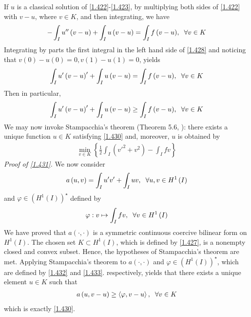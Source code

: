 \documentclass[a4paper,oneside]{article}
\numberwithin{equation}{section}
\begin{document}
If $u$ is a classical solution of \eqref{1.422}-\eqref{1.423}, by multiplying both sides of \eqref{1.422} with $v-u$, where $v\in K$, and then integrating,  we have
\begin{align}
\label{1.428}
 - \int_I {u''\left( {v - u} \right)}  + \int_I {u\left( {v - u} \right)}  = \int_I {f\left( {v - u} \right)} ,\hspace{0.2cm}\forall v \in K
\end{align}
Integrating by parts the first integral in the left hand side of \eqref{1.428} and noticing that $v\left(0\right)-u\left(0\right)=0,v\left(1\right)-u\left(1\right)=0$, yields
\begin{align}
\int_I {u'\left( {v - u} \right)'}  + \int_I {u\left( {v - u} \right)}  = \int_I {f\left( {v - u} \right)} ,\hspace{0.2cm}\forall v \in K
\end{align}
Then in particular,
\begin{align}
\label{1.430}
\int_I {u'\left( {v - u} \right)'}  + \int_I {u\left( {v - u} \right)}  \ge \int_I {f\left( {v - u} \right)} ,\hspace{0.2cm}\forall v \in K
\end{align}
We may now invoke Stampacchia's theorem (Theorem 5.6, \cite{1}): there exists a unique function $u\in K$ satisfying \eqref{1.430} and, moreover, $u$ is obtained by
\begin{align}
\label{1.431}
\mathop {\min }\limits_{v \in K} \left\{ {\frac{1}{2}\int_I {\left( {v{'^2} + {v^2}} \right)}  - \int_I {fv} } \right\}
\end{align}
\textit{Proof of \eqref{1.431}.} We now consider
\begin{align}
\label{1.432}
a\left( {u,v} \right) = \int_I {u'v'}  + \int_I {uv} ,\hspace{0.2cm}\forall u,v \in H^1\left(I\right)
\end{align}
and $\varphi \in \left(H^1\left(I\right)\right)^{\star}$ defined by
\begin{align}
\label{1.433}
\varphi :v \mapsto \int_I {fv} ,\hspace{0.2cm}\forall v \in H^1\left(I\right)
\end{align}
We have proved that $a\left(\cdot,\cdot\right)$ is a symmetric continuous coercive bilinear form on $H^1\left(I\right)$. The chosen set $K\subset H^1\left(I\right)$, which is defined by \eqref{1.427}, is a nonempty closed and convex subset. Hence, the hypotheses of Stampacchia's theorem are met. Applying Stampacchia's theorem to $a\left(\cdot,\cdot\right)$ and $\varphi \in \left(H^1\left(I\right)\right)^{\star}$, which are defined by \eqref{1.432} and \eqref{1.433}. respectively, yields that there exists a unique element $u\in K$ such that
\begin{align}
a\left( {u,v - u} \right) \ge \left\langle {\varphi ,v - u} \right\rangle ,\hspace{0.2cm}\forall v \in K
\end{align}
which is exactly \eqref{1.430}.
\end{document}

